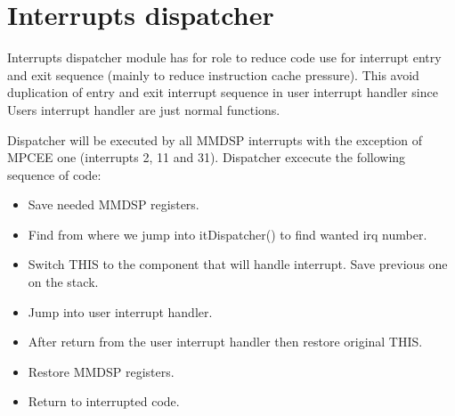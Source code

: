\chapter{Interrupts dispatcher}

Interrupts dispatcher module has for role to reduce code use for interrupt entry
and exit sequence (mainly to reduce instruction cache pressure). This avoid
duplication of entry and exit interrupt sequence in user interrupt handler since
Users interrupt handler are just normal functions.

Dispatcher will be executed by all MMDSP interrupts with the exception of MPCEE
one (interrupts 2, 11 and 31).
Dispatcher excecute the following sequence of code:
\begin{itemize}
  \item Save needed MMDSP registers.
  \item Find from where we jump into itDispatcher() to find wanted irq number.
  \item Switch THIS to the component that will handle interrupt. Save previous
  one on the stack.
  \item Jump into user interrupt handler.
  \item After return from the user interrupt handler then restore original THIS.
  \item Restore MMDSP registers.
  \item Return to interrupted code.
\end{itemize}
